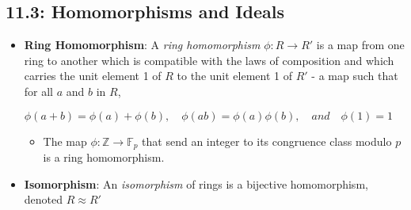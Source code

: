 \documentclass[12pt]{article}
\begin{document}
\subsection*{11.3: Homomorphisms and Ideals}
\begin{itemize}
  \item \textbf{Ring Homomorphism}: A \textit{ring homomorphism} $\phi: R \rightarrow R'$ is a map from one ring to another which is compatible with the laws of composition and which carries the unit element 1 of $R$ to the unit element 1 of $R'$ - a map such that for all $a$ and $b$ in $R$,
  \begin{center}
    $\phi(a + b) = \phi(a) + \phi(b), \quad \phi(ab) = \phi(a)\phi(b), \quad and \quad \phi(1) = 1$
  \end{center}
  \begin{itemize}
    \item The map $\phi: \mathbb{Z} \rightarrow \mathbb{F}_p$ that send an integer to its congruence class modulo $p$ is a ring homomorphism.
  \end{itemize}
  \item \textbf{Isomorphism}: An \textit{isomorphism} of rings is a bijective homomorphism, denoted $R \approx R'$
\end{itemize}


\iffalse
\subsection*{Problem 1.1}
\textbf{Prove that 7 + $\sqrt[3]{2}$ and $\sqrt{3}$ + $\sqrt{-5}$ are algeabraic numbers.}
\begin{proof}
Since p is not in M, it is not between or equal to a and b, and therefore any interval that contains p is not within M.
\end{proof}
\fi
\end{document}
